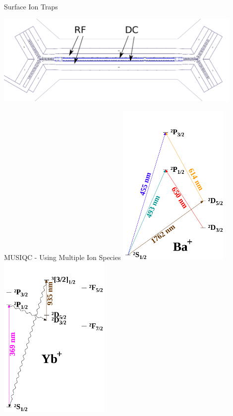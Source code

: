 \documentclass{beamer}
\begin{document}
\begin{frame}{Surface Ion Traps}
	\centerline{\includegraphics[width=0.9\textwidth]{HOA}}
\end{frame}

\begin{frame}{MUSIQC - Using Multiple Ion Species}
	\centering
	\includegraphics[width=0.4\textwidth]{ionized-Ba}
	\hfill
	\includegraphics[width=0.4\textwidth]{ionized-Yb}
\end{frame}
\end{document}
